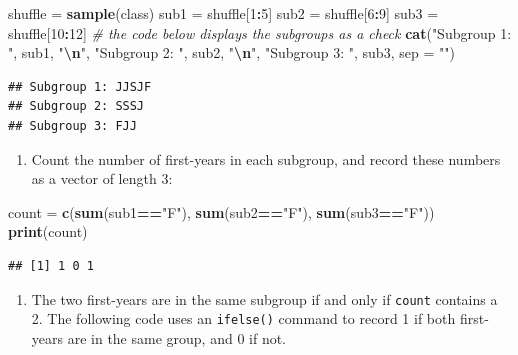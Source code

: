 \documentclass[
]{book}
\newenvironment{Shaded}{\begin{snugshade}}{\end{snugshade}}
\newcommand{\AttributeTok}[1]{\textcolor[rgb]{0.13,0.29,0.53}{#1}}
\newcommand{\CommentTok}[1]{\textcolor[rgb]{0.56,0.35,0.01}{\textit{#1}}}
\newcommand{\DecValTok}[1]{\textcolor[rgb]{0.00,0.00,0.81}{#1}}
\newcommand{\FunctionTok}[1]{\textcolor[rgb]{0.13,0.29,0.53}{\textbf{#1}}}
\newcommand{\NormalTok}[1]{#1}
\newcommand{\OtherTok}[1]{\textcolor[rgb]{0.56,0.35,0.01}{#1}}
\newcommand{\SpecialCharTok}[1]{\textcolor[rgb]{0.81,0.36,0.00}{\textbf{#1}}}
\newcommand{\StringTok}[1]{\textcolor[rgb]{0.31,0.60,0.02}{#1}}
\providecommand{\tightlist}{%
  \setlength{\itemsep}{0pt}\setlength{\parskip}{0pt}}
\theoremstyle{definition}
\theoremstyle{definition}
\theoremstyle{definition}
\theoremstyle{definition}
\theoremstyle{remark}
\begin{document}
\begin{Shaded}
\begin{Highlighting}[]
\NormalTok{shuffle }\OtherTok{=} \FunctionTok{sample}\NormalTok{(class)}
\NormalTok{sub1 }\OtherTok{=}\NormalTok{ shuffle[}\DecValTok{1}\SpecialCharTok{:}\DecValTok{5}\NormalTok{]}
\NormalTok{sub2 }\OtherTok{=}\NormalTok{ shuffle[}\DecValTok{6}\SpecialCharTok{:}\DecValTok{9}\NormalTok{]}
\NormalTok{sub3 }\OtherTok{=}\NormalTok{ shuffle[}\DecValTok{10}\SpecialCharTok{:}\DecValTok{12}\NormalTok{]}
\CommentTok{\# the code below displays the subgroups as a check}
\FunctionTok{cat}\NormalTok{(}\StringTok{"Subgroup 1: "}\NormalTok{, sub1, }\StringTok{"}\SpecialCharTok{\textbackslash{}n}\StringTok{"}\NormalTok{,}
    \StringTok{"Subgroup 2: "}\NormalTok{, sub2, }\StringTok{"}\SpecialCharTok{\textbackslash{}n}\StringTok{"}\NormalTok{,}
    \StringTok{"Subgroup 3: "}\NormalTok{, sub3, }\AttributeTok{sep =} \StringTok{""}\NormalTok{)}
\end{Highlighting}
\end{Shaded}

\begin{verbatim}
## Subgroup 1: JJSJF
## Subgroup 2: SSSJ
## Subgroup 3: FJJ
\end{verbatim}

\begin{enumerate}
\def\labelenumi{\arabic{enumi}.}
\setcounter{enumi}{2}
\tightlist
\item
  Count the number of first-years in each subgroup, and record these numbers as a vector of length 3:
\end{enumerate}

\begin{Shaded}
\begin{Highlighting}[]
\NormalTok{count }\OtherTok{=} \FunctionTok{c}\NormalTok{(}\FunctionTok{sum}\NormalTok{(sub1}\SpecialCharTok{==}\StringTok{"F"}\NormalTok{),}
            \FunctionTok{sum}\NormalTok{(sub2}\SpecialCharTok{==}\StringTok{"F"}\NormalTok{),}
            \FunctionTok{sum}\NormalTok{(sub3}\SpecialCharTok{==}\StringTok{"F"}\NormalTok{))}
\FunctionTok{print}\NormalTok{(count)}
\end{Highlighting}
\end{Shaded}

\begin{verbatim}
## [1] 1 0 1
\end{verbatim}

\begin{enumerate}
\def\labelenumi{\arabic{enumi}.}
\setcounter{enumi}{3}
\tightlist
\item
  The two first-years are in the same subgroup if and only if \texttt{count} contains a 2. The following code uses an \texttt{ifelse()} command to record 1 if both first-years are in the same group, and 0 if not.
\end{enumerate}
\end{document}

